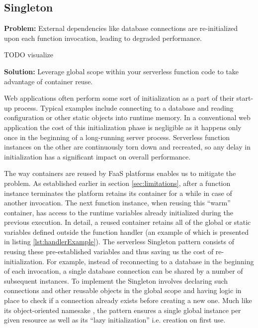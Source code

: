 

\subsection{Singleton} \label{subsec:Singleton}

\textbf{Problem:} External dependencies like database connections are re-initialized upon each function invocation, leading to degraded performance.

TODO visualize

\textbf{Solution:} Leverage global scope within your serverless function code to take advantage of container reuse.

Web applications often perform some sort of initialization as a part of their start-up process. Typical examples include connecting to a database and reading configuration or other static objects into runtime memory. In a conventional web application the cost of this initialization phase is negligible as it happens only once in the beginning of a long-running server process. Serverless function instances on the other are continuously torn down and recreated, so any delay in initialization has a significant impact on overall performance.

The way containers are reused by FaaS platforms enables us to mitigate the problem. As established earlier in section \ref{sec:limitations}, after a function instance terminates the platform retains its container for a while in case of another invocation. The next function instance, when reusing this ``warm'' container, has access to the runtime variables already initialized during the previous execution. In detail, a reused container retains all of the global or static variables defined outside the function handler (an example of which is presented in listing \ref{lst:handlerExample}). The serverless Singleton pattern consists of reusing these pre-established variables and thus saving us the cost of re-initialization. For example, instead of reconnecting to a database in the beginning of each invocation, a single database connection can be shared by a number of subsequent instances. To implement the Singleton involves declaring such connections and other reusable objects in the global scope and having logic in place to check if a connection already exists before creating a new one. Much like its object-oriented namesake \parencite{gamma94designPatterns}, the pattern ensures a single global instance per given resource as well as its ``lazy initialization'' i.e. creation on first use. \parencite{aws18serverlessLens}

